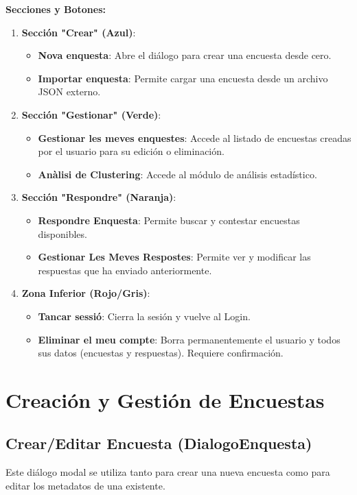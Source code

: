 \documentclass[a4paper,12pt]{article}
\begin{document}
\textbf{Secciones y Botones:}
\begin{enumerate}
    \item \textbf{Sección "Crear" (Azul)}:
        \begin{itemize}
            \item \textbf{Nova enquesta}: Abre el diálogo para crear una encuesta desde cero.
            \item \textbf{Importar enquesta}: Permite cargar una encuesta desde un archivo JSON externo.
        \end{itemize}
    \item \textbf{Sección "Gestionar" (Verde)}:
        \begin{itemize}
            \item \textbf{Gestionar les meves enquestes}: Accede al listado de encuestas creadas por el usuario para su edición o eliminación.
            \item \textbf{Anàlisi de Clustering}: Accede al módulo de análisis estadístico.
        \end{itemize}
    \item \textbf{Sección "Respondre" (Naranja)}:
        \begin{itemize}
            \item \textbf{Respondre Enquesta}: Permite buscar y contestar encuestas disponibles.
            \item \textbf{Gestionar Les Meves Respostes}: Permite ver y modificar las respuestas que ha enviado anteriormente.
        \end{itemize}
    \item \textbf{Zona Inferior (Rojo/Gris)}:
        \begin{itemize}
            \item \textbf{Tancar sessió}: Cierra la sesión y vuelve al Login.
            \item \textbf{Eliminar el meu compte}: Borra permanentemente el usuario y todos sus datos (encuestas y respuestas). Requiere confirmación.
        \end{itemize}
\end{enumerate}

\section{Creación y Gestión de Encuestas}

\subsection{Crear/Editar Encuesta (DialogoEnquesta)}
Este diálogo modal se utiliza tanto para crear una nueva encuesta como para editar los metadatos de una existente.
\end{document}
